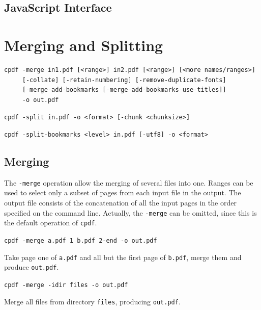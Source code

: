 \documentclass{book}
\newcommand{\cpdf}{\texttt{cpdf}}
\begin{document}
\begin{jscpdflib}
\clearpage
\section*{JavaScript Interface}
\begin{small}\tt




\end{small}
\end{jscpdflib}

\chapter{Merging and Splitting}\label{chap:2}
  \begin{framed}
  \small
  \noindent\begin{verbatim}
cpdf -merge in1.pdf [<range>] in2.pdf [<range>] [<more names/ranges>]
     [-collate] [-retain-numbering] [-remove-duplicate-fonts]
     [-merge-add-bookmarks [-merge-add-bookmarks-use-titles]]
     -o out.pdf\end{verbatim}

  \vspace{1.5mm}
  \noindent\verb!cpdf -split in.pdf -o <format> [-chunk <chunksize>]!

  \vspace{1.5mm}
  \noindent\verb!cpdf -split-bookmarks <level> in.pdf [-utf8] -o <format>!
  \end{framed}

  \vspace{12mm}
  \section{Merging}
  The \texttt{-merge} operation allow the merging of several files into one.
Ranges can be used to select only a subset of pages from each
input file in the output. The output file consists of the concatenation of all
the input pages in the order specified on the command line. Actually, the
\texttt{-merge} can be omitted, since this is the default operation of \cpdf.

  \begin{framed}\small
    \noindent\verb!cpdf -merge a.pdf 1 b.pdf 2-end -o out.pdf!

    \vspace{2.5mm}
    \noindent Take page one of \texttt{a.pdf} and all but the first page of
\texttt{b.pdf}, merge them and produce \texttt{out.pdf}.

    \vspace{1.5mm}
    \noindent\verb!cpdf -merge -idir files -o out.pdf!

    \vspace{2.5mm}
    \noindent Merge all files from directory \texttt{files}, producing \texttt{out.pdf}.

  \end{framed}
\end{document}
